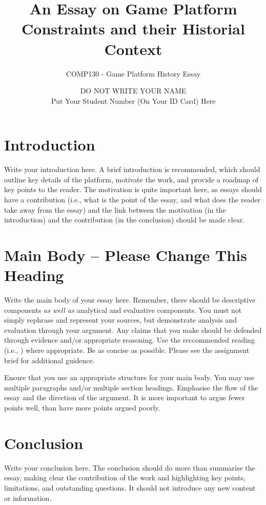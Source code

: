 \documentclass{scrartcl}
\title{An Essay on Game Platform Constraints and their Historial Context}
\subtitle{COMP130 - Game Platform History Essay}
\author{DO NOT WRITE YOUR NAME\\Put Your Student Number (On Your ID Card) Here}
\begin{document}
\maketitle


\section{Introduction}

Write your introduction here. A brief introduction is recommended, which should outline key details of the platform, motivate the work, and provide a roadmap of key points to the reader. The motivation is quite important here, as essays should have a contribution (i.e., what is the point of the essay, and what does the reader take away from the essay) and the link between the motivation (in the introduction) and the contribution (in the conclusion) should be made clear.

\section{Main Body -- Please Change This Heading}

Write the main body of your essay here. Remember, there should be descriptive components \textit{as well as} analytical and evaluative components. You must not simply rephrase and represent your sources, but demonstrate analysis and evaluation through your argument. Any claims that you make should be defended through evidence and/or appropriate reasoning. Use the reccommended reading (i.e., \cite{evans2006invisible, squid-news, atariage}) where appropriate. Be as concise as possible. Please see the assignment brief for additional guidence. 

Ensure that you use an appropriate structure for your main body. You may use multiple paragraphs and/or multiple section headings. Emphasise the flow of the essay and the direction of the argument. It is more important to argue fewer points well, than have more points argued poorly.

\section{Conclusion}

Write your conclusion here. The conclusion should do more than summarise the essay, making clear the contribution of the work and highlighting key points, limitations, and outstanding questions. It should not introduce any new content or information.



\end{document}
